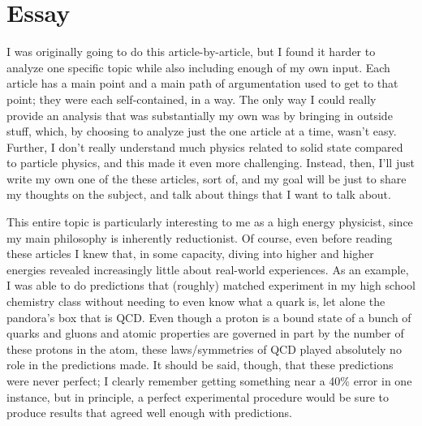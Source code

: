 \section{Essay}

I was originally going to do this article-by-article, but I found it harder to analyze one specific topic while also including enough of my own input. Each article has a main point and a main path of argumentation used to get to that point; they were each self-contained, in a way. The only way I could really provide an analysis that was substantially my own was by bringing in outside stuff, which, by choosing to analyze just the one article at a time, wasn't easy. Further, I don't really understand much physics related to solid state compared to particle physics, and this made it even more challenging. Instead, then, I'll just write my own one of the these articles, sort of, and my goal will be just to share my thoughts on the subject, and talk about things that I want to talk about.

This entire topic is particularly interesting to me as a high energy physicist, since my main philosophy is inherently reductionist. Of course, even before reading these articles I knew that, in some capacity, diving into higher and higher energies revealed increasingly little about real-world experiences. As an example, I was able to do predictions that (roughly) matched experiment in my high school chemistry class without needing to even know what a quark is, let alone the pandora's box that is QCD. Even though a proton is a bound state of a bunch of quarks and gluons and atomic properties are governed in part by the number of these protons in the atom, these laws/symmetries of QCD played absolutely no role in the predictions made. It should be said, though, that these predictions were never perfect; I clearly remember getting something near a 40\% error in one instance, but in principle, a perfect experimental procedure would be sure to produce results that agreed well enough with predictions.

